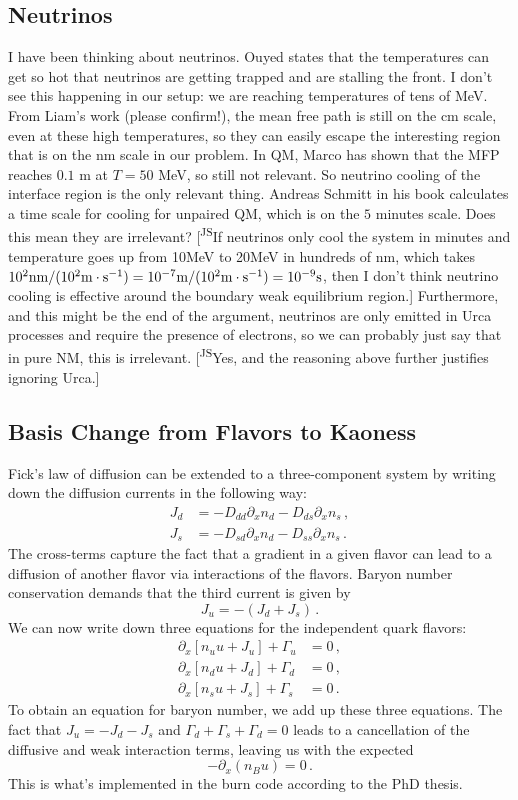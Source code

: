 \documentclass[11pt]{article}
\newcommand{\AH}[1]{{\color{cyan}#1}}
\newcommand{\JScom}[1]{\textsf{\color{violet} [\textsuperscript{JS}#1]}}
\newcommand{\p}{\partial}
\begin{document}
\subsection{Neutrinos}
\AH{I have been thinking about neutrinos. Ouyed states that the temperatures can get so hot that neutrinos are getting trapped and are stalling the front. I don't see this happening in our setup: we are reaching temperatures of tens of MeV. From Liam's work (please confirm!), the mean free path is still on the cm scale, even at these high temperatures, so they can easily escape the interesting region that is on the nm scale in our problem. In QM, Marco has shown that the MFP reaches $0.1$ m at $T=50$ MeV, so still not relevant. So neutrino cooling of the interface region is the only relevant thing. Andreas Schmitt in his book calculates a time scale for cooling for unpaired QM, which is on the $5$ minutes scale. Does this mean they are irrelevant? \JScom{If neutrinos only cool the system in minutes and temperature goes up from 10MeV to 20MeV in hundreds of nm, which takes $\rm{10^2 nm/(10^2m\cdot s^{-1}) = 10^{-7} m/(10^2m\cdot s^{-1})} = 10^{-9}s$, then I don't think neutrino cooling is effective around the boundary weak equilibrium region.} Furthermore, and this might be the end of the argument, neutrinos are only emitted in Urca processes and require the presence of electrons, so we can probably just say that in pure NM, this is irrelevant. }\JScom{Yes, and the reasoning above further justifies ignoring Urca.}
\subsection{Basis Change from Flavors to Kaoness}

Fick's law of diffusion can be extended to a three-component system by writing down the diffusion currents in the following way:
\begin{align}
    J_d&= -D_{dd}\p_xn_d-D_{ds}\p_xn_s \, , \\
    J_s&=-D_{sd}\p_xn_d-D_{ss}\p_xn_s \, .
\end{align}
The cross-terms capture the fact that a gradient in a given flavor can lead to a diffusion of another flavor via interactions of the flavors. Baryon number conservation demands that the third current is given by
\begin{equation}
    J_u=-\left(J_d+J_s \right) \, .
\end{equation}
We can now write down three equations for the independent quark flavors:
\begin{align}
    \p_x\left[n_uu+J_u\right]+\Gamma_u&=0 \, ,\\
    \p_x\left[n_du+J_d\right]+\Gamma_d&=0 \, ,\\
    \p_x\left[n_su+J_s\right]+\Gamma_s&=0 \, .
\end{align}
To obtain an equation for baryon number, we add up these three equations. The fact that $J_u=-J_d-J_s$ and $\Gamma_d+\Gamma_s+\Gamma_d=0$ leads to a cancellation of the diffusive and weak interaction terms, leaving us with the expected
\begin{equation}
    -\p_x\left(n_Bu\right)=0 \, .
\end{equation}
This is what's implemented in the burn code according to the PhD thesis.
\end{document}
